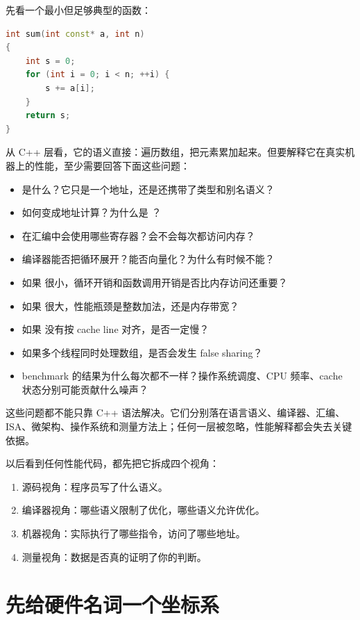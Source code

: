 先看一个最小但足够典型的函数：

\begin{lstlisting}[language=C++]
int sum(int const* a, int n)
{
    int s = 0;
    for (int i = 0; i < n; ++i) {
        s += a[i];
    }
    return s;
}
\end{lstlisting}

从 C++ 层看，它的语义直接：遍历数组，把元素累加起来。但要解释它在真实机器上的性能，至少需要回答下面这些问题：

\begin{itemize}
  \item {} 是什么？它只是一个地址，还是还携带了类型和别名语义？
  \item {} 如何变成地址计算？为什么是 ？
  \item {} 在汇编中会使用哪些寄存器？会不会每次都访问内存？
  \item 编译器能否把循环展开？能否向量化？为什么有时候不能？
  \item 如果  很小，循环开销和函数调用开销是否比内存访问还重要？
  \item 如果  很大，性能瓶颈是整数加法，还是内存带宽？
  \item 如果  没有按 cache line 对齐，是否一定慢？
  \item 如果多个线程同时处理数组，是否会发生 false sharing？
  \item benchmark 的结果为什么每次都不一样？操作系统调度、CPU 频率、cache 状态分别可能贡献什么噪声？
\end{itemize}

这些问题都不能只靠 C++ 语法解决。它们分别落在语言语义、编译器、汇编、ISA、微架构、操作系统和测量方法上；任何一层被忽略，性能解释都会失去关键依据。

\begin{mentalmodel}
以后看到任何性能代码，都先把它拆成四个视角：

\begin{enumerate}
  \item 源码视角：程序员写了什么语义。
  \item 编译器视角：哪些语义限制了优化，哪些语义允许优化。
  \item 机器视角：实际执行了哪些指令，访问了哪些地址。
  \item 测量视角：数据是否真的证明了你的判断。
\end{enumerate}
\end{mentalmodel}

\section{先给硬件名词一个坐标系}

